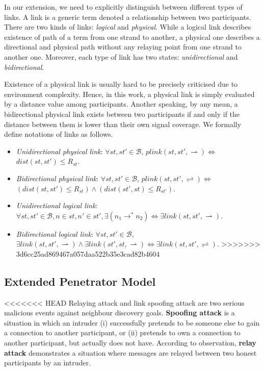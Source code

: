 \begin{flushleft}
\begin{flushleft}
\begin{Definition}
\begin{itemize}
In our extension, we need to explicitly distinguish between different types of links. A link is a generic term denoted a relationship between two participants. There are two kinds of links: \emph{logical} and \emph{physical}. While a logical link describes existence of path of a term from one strand to another, a physical one describes a directional and physical path without any relaying point from one strand to another one. Moreover, each type of link has two states: \emph{unidirectional} and \emph{bidirectional}. 

Existence of a physical link is usually hard to be precisely criticised due to environment complexity. Hence, in this work, a physical link is simply evaluated by a distance value among participants. Another speaking, by any mean, a bidirectional physical link exists between two participants if and only if the distance between them is lower than their own signal coverage. We formally define notations of links as follows.

\begin{Definition}
\begin{itemize}
\item \emph{Unidirectional physical link}: $\forall st,st' \in \mathcal{B}$, $plink(st,st', \rightharpoonup) \Leftrightarrow$ $dist(st,st') \le R_{st}$.
\item \emph{Bidirectional physical link}: $\forall st,st' \in \mathcal{B}$, $plink(st,st', \rightleftharpoons) \Leftrightarrow$ $(dist(st,st') \le R_{st}) \wedge (dist(st',st) \le R_{st'})$.
\item \emph{Unidirectional logical link}: $\forall st, st' \in \mathcal{B}, n \in st, n' \in st', \exists (n_1 \rightarrow^* n_2) \Leftrightarrow \exists link(st, st',\rightharpoonup)$.
\item \emph{Bidirectional logical link}: $\forall st, st' \in \mathcal{B},$ $ \exists link(st, st',\rightharpoonup) \wedge \exists link(st', st,\rightharpoonup) \Leftrightarrow \exists link(st, st',\rightleftharpoons)$.
>>>>>>> 3d6cc25ad869467a057daa522b35e3cad82b4604
\end{itemize}	
\end{Definition}

\subsection{Extended Penetrator Model}\label{penndp2}

<<<<<<< HEAD
Relaying attack and link spoofing attack are two serious malicious events against neighbour discovery goals. \textbf{Spoofing attack} is a situation in which an intruder (i) successfully pretends to be someone else to gain a connection to another participant, or (ii) pretends to own a connection to another participant, but actually does not have. According to observation, \textbf{relay attack} demonstrates a situation where messages are relayed between two honest participants by an intruder. 


\end{itemize}
\end{Definition}
\end{flushleft}
\end{flushleft}
